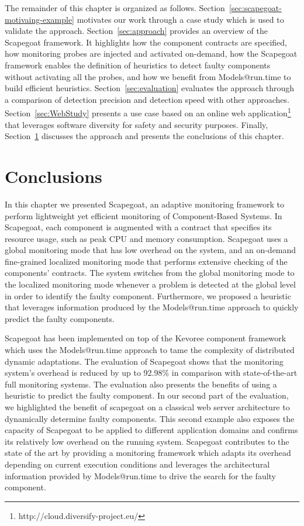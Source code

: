 The remainder of this chapter is organized as follows.
Section~\ref{sec:scapegoat-motivaing-example} motivates our work through a case study which is used to validate the approach.
Section~\ref{sec:approach} provides an overview of the Scapegoat framework.
It highlights how the component contracts are specified, how monitoring probes are injected and activated on-demand, how the Scapegoat framework enables the definition of heuristics to detect faulty components without activating all the probes, and how we benefit from Models@run.time to build efficient heuristics.
Section~\ref{sec:evaluation} evaluates the approach through a comparison of detection precision and detection speed with other approaches.
Section~\ref{sec:WebStudy} presents a use case based on an online web application\footnote{http://cloud.diversify-project.eu/} that leverages software diversity for safety and security purposes.
Finally, Section~\ref{sec:conclusion} discusses the approach and presents the conclusions of this chapter.




%

\section{Conclusions}\label{sec:conclusion}
In this chapter we presented Scapegoat, an adaptive monitoring framework to perform lightweight yet efficient monitoring of Component-Based Systems.
In Scapegoat, each component is augmented with a contract that specifies its resource usage, such as peak CPU and memory consumption.
Scapegoat uses a global monitoring mode that has low overhead on the system, and an on-demand fine-grained localized monitoring mode that performs extensive checking of the components' contracts.
The system switches from the global monitoring mode to the localized monitoring mode whenever a problem is detected at the global level in order to identify the faulty component.
Furthermore, we proposed a heuristic that leverages information produced by the Models@run.time approach to quickly predict the faulty components. 

Scapegoat has been implemented on top of the Kevoree component framework which uses the Models@run.time approach to tame the complexity of distributed dynamic adaptations.
The evaluation of Scapegoat shows that the monitoring system's overhead is reduced by up to 92.98\% in comparison with state-of-the-art full monitoring systems. 
The evaluation also presents the benefits of using a heuristic to predict the faulty component.
In our second part of the evaluation, we highlighted the benefit of scapegoat on a classical web server architecture to dynamically determine faulty components.
This second example also exposes the capacity of Scapegoat to be applied to different application domains and confirms its relatively low overhead on the running system.
Scapegoat contributes to the state of the art by providing a monitoring framework which adapts its overhead depending on current execution conditions and leverages the architectural information provided by Models@run.time to drive the search for the faulty component.

